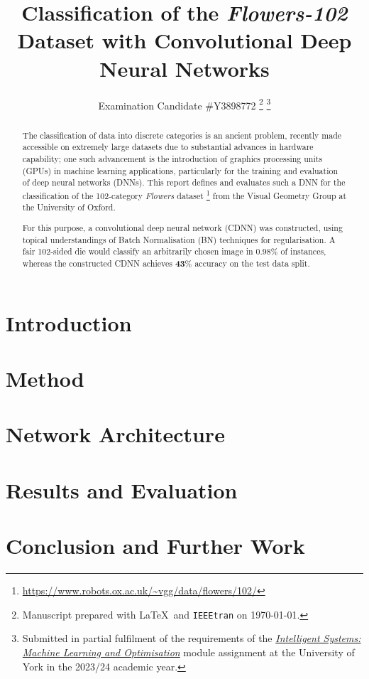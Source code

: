 \documentclass[journal]{IEEEtran}
\title{Classification of the \emph{Flowers-102} Dataset with Convolutional Deep
    Neural Networks}
\author{Examination Candidate \#Y3898772%
    \thanks{Manuscript prepared with \LaTeX\ and \texttt{IEEEtran} on \today.}
    \thanks{Submitted in partial fulfilment of the requirements of the 
        \href{https://www.york.ac.uk/students/studying/manage/programmes/%
        module-catalogue/module/COM00026I/2023-24}{\emph{Intelligent Systems:
        Machine Learning and Optimisation}} module assignment at the University
        of York in the 2023/24 academic year.}%
}
\newcommand\networkperformance{43}
\begin{document}
\maketitle
\begin{abstract}
    The classification of data into discrete categories is an ancient problem,
    recently made accessible on extremely large datasets due to substantial
    advances in hardware capability; one such advancement is the introduction of
    graphics processing units (GPUs) in machine learning applications,
    particularly for the training and evaluation of deep neural networks (DNNs).
    This report defines and evaluates such a DNN for the classification of the
    102-category \emph{Flowers} dataset%
    \footnote{\url{https://www.robots.ox.ac.uk/~vgg/data/flowers/102/}} from the
    Visual Geometry Group at the University of Oxford.

    For this purpose, a convolutional deep neural network (CDNN) was
    constructed, using topical understandings of Batch Normalisation (BN)
    techniques for regularisation. A fair 102-sided die would classify an
    arbitrarily chosen image in $\mathbf{0.98}$\% of instances, whereas the
    constructed CDNN achieves $\mathbf{\networkperformance}$\% accuracy on the
    test data split.
\end{abstract}
\section{Introduction}
\section{Method}
\section{Network Architecture}
\section{Results and Evaluation}
\section{Conclusion and Further Work}

\nocite{*} %


\end{document}

